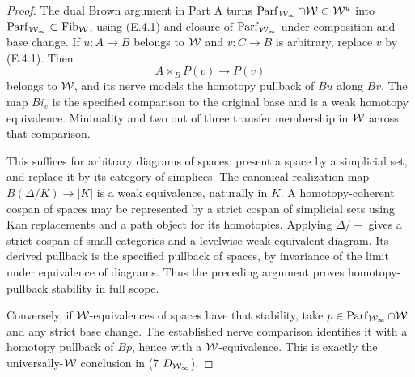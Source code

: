 \begin{proof}
The dual Brown argument in Part A turns
$\operatorname{Parf}_{\mathcal{W}_{\infty}}\cap\mathcal{W}\subset\mathcal{W}^u$ into
$\operatorname{Parf}_{\mathcal{W}_{\infty}}\subset\operatorname{Fib}_{\mathcal{W}}$, using (E.4.1) and
closure of $\operatorname{Parf}_{\mathcal{W}_{\infty}}$ under composition and base
change. If $u:A\to B$ belongs to $\mathcal{W}$ and $v:C\to B$ is
arbitrary, replace $v$ by (E.4.1). Then
\[
 A\times_BP(v)\longrightarrow P(v)
\]
belongs to $\mathcal{W}$, and its nerve models the homotopy pullback
of $Bu$ along $Bv$. The map $Bi_v$ is the specified comparison
to the original base and is a weak homotopy equivalence.
Minimality and two out of three transfer membership in $\mathcal{W}$
across that comparison.

This suffices for arbitrary diagrams of spaces: present a
space by a simplicial set, and replace it by its category of
simplices. The canonical realization map
$B(\Delta/K)\to|K|$ is a weak equivalence, naturally in
$K$. A homotopy-coherent cospan of spaces may be represented
by a strict cospan of simplicial sets using Kan replacements
and a path object for its homotopies. Applying $\Delta/-$
gives a strict cospan of small categories and a
levelwise weak-equivalent diagram. Its derived pullback is
the specified pullback of spaces, by invariance of the limit
under equivalence of diagrams. Thus the preceding argument
proves homotopy-pullback stability in full scope.

Conversely, if $\mathcal{W}$-equivalences of spaces have that stability,
take $p\in\operatorname{Parf}_{\mathcal{W}_{\infty}}\cap\mathcal{W}$ and any strict base change.
The established nerve comparison identifies it with a
homotopy pullback of $Bp$, hence with a $\mathcal{W}$-equivalence.
This is exactly the universally-$\mathcal{W}$ conclusion in (7 $D_{\mathcal{W}_{\infty}}$).
\end{proof}

